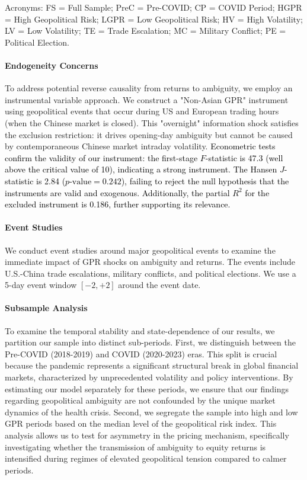 \documentclass[preprint,12pt,authoryear]{elsarticle}
\begin{document}
\begin{table}[htbp]
\begin{threeparttable}
\begin{tablenotes}[flushleft]
\item[] Acronyms: FS = Full Sample; PreC = Pre-COVID; CP = COVID Period; HGPR = High Geopolitical Risk; LGPR = Low Geopolitical Risk; HV = High Volatility; LV = Low Volatility; TE = Trade Escalation; MC = Military Conflict; PE = Political Election.
\end{tablenotes}
\end{threeparttable}
\end{table}

\paragraph{Endogeneity Concerns} To address potential reverse causality from returns to ambiguity, we employ an instrumental variable approach. We construct a "Non-Asian GPR" instrument using geopolitical events that occur during US and European trading hours (when the Chinese market is closed). This "overnight" information shock satisfies the exclusion restriction: it drives opening-day ambiguity but cannot be caused by contemporaneous Chinese market intraday volatility. \textcolor{black}{ Econometric tests confirm the validity of our instrument: the first-stage $F$-statistic is 47.3 (well above the critical value of 10), indicating a strong instrument. The Hansen $J$-statistic is 2.84 ($p\text{-value} = 0.242$), failing to reject the null hypothesis that the instruments are valid and exogenous. Additionally, the partial $R^2$ for the excluded instrument is 0.186, further supporting its relevance.}

\paragraph{Event Studies} We conduct event studies around major geopolitical events to examine the immediate impact of GPR shocks on ambiguity and returns. The events include U.S.-China trade escalations, military conflicts, and political elections. We use a 5-day event window $[-2, +2]$ around the event date.

\paragraph{Subsample Analysis} To examine the temporal stability and state-dependence of our results, we partition our sample into distinct sub-periods. First, we distinguish between the Pre-COVID (2018-2019) and COVID (2020-2023) eras. This split is crucial because the pandemic represents a significant structural break in global financial markets, characterized by unprecedented volatility and policy interventions. By estimating our model separately for these periods, we ensure that our findings regarding geopolitical ambiguity are not confounded by the unique market dynamics of the health crisis. Second, we segregate the sample into high and low GPR periods based on the median level of the geopolitical risk index. This analysis allows us to test for asymmetry in the pricing mechanism, specifically investigating whether the transmission of ambiguity to equity returns is intensified during regimes of elevated geopolitical tension compared to calmer periods.
\end{document}
